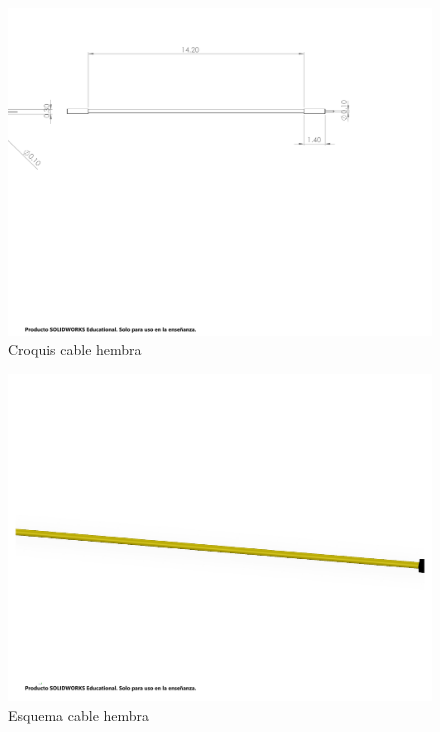     \begin{figure}[H]
        \centering
        \includegraphics[trim = {10mm 10mm 10mm 10mm},clip,scale=0.2]{25/img/Croquis cable hembra.pdf}
        \caption{Croquis cable hembra}
        \label{fig:lcd-16x2}
    \end{figure}
    \begin{figure}[H]
        \centering
        \includegraphics[trim = {10mm 10mm 10mm 10mm},clip,scale=0.2]{25/img/Cable Hembra.pdf}
        \caption{Esquema cable hembra}
        \label{fig:lcd-16x2}
    \end{figure}
